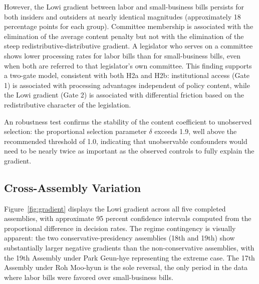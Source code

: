 \documentclass[11pt]{article}
\begin{document}
However, the Lowi gradient between labor and small-business bills persists for both insiders and outsiders at nearly identical magnitudes (approximately 18 percentage points for each group). Committee membership is associated with the elimination of the average content penalty but not with the elimination of the steep redistributive-distributive gradient. A legislator who serves on a committee shows lower processing rates for labor bills than for small-business bills, even when both are referred to that legislator's own committee. This finding supports a two-gate model, consistent with both H2a and H2b: institutional access (Gate 1) is associated with processing advantages independent of policy content, while the Lowi gradient (Gate 2) is associated with differential friction based on the redistributive character of the legislation.

An \citet{oster2019} robustness test confirms the stability of the content coefficient to unobserved selection: the proportional selection parameter $\delta$ exceeds 1.9, well above the recommended threshold of 1.0, indicating that unobservable confounders would need to be nearly twice as important as the observed controls to fully explain the gradient.

\subsection{Cross-Assembly Variation}
\label{sec:results-cross}

Figure~\ref{fig:gradient} displays the Lowi gradient across all five completed assemblies, with approximate 95 percent confidence intervals computed from the proportional difference in decision rates. The regime contingency is visually apparent: the two conservative-presidency assemblies (18th and 19th) show substantially larger negative gradients than the non-conservative assemblies, with the 19th Assembly under Park Geun-hye representing the extreme case. The 17th Assembly under Roh Moo-hyun is the sole reversal, the only period in the data where labor bills were favored over small-business bills.
\end{document}
